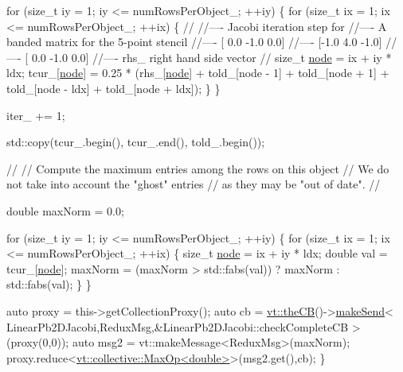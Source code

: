 \begin{DoxyCodeInclude}
    \textcolor{keywordflow}{for} (\textcolor{keywordtype}{size\_t} iy = 1; iy <= numRowsPerObject\_; ++iy) \{
      \textcolor{keywordflow}{for} (\textcolor{keywordtype}{size\_t} ix = 1; ix <= numRowsPerObject\_; ++ix) \{
        \textcolor{comment}{//}
        \textcolor{comment}{//---- Jacobi iteration step for}
        \textcolor{comment}{//---- A banded matrix for the 5-point stencil}
        \textcolor{comment}{//---- [ 0.0  -1.0   0.0]}
        \textcolor{comment}{//---- [-1.0   4.0  -1.0]}
        \textcolor{comment}{//---- [ 0.0  -1.0   0.0]}
        \textcolor{comment}{//---- rhs\_ right hand side vector}
        \textcolor{comment}{//}
        \textcolor{keywordtype}{size\_t} \hyperlink{namespacevt_1_1config_a46e57c33bee1b9f1fa95455af86d80e0a576033c81e2ddd03d721ecef3b1b3f81}{node} = ix + iy * ldx;
        tcur\_[\hyperlink{namespacevt_1_1config_a46e57c33bee1b9f1fa95455af86d80e0a576033c81e2ddd03d721ecef3b1b3f81}{node}] = 0.25 * (rhs\_[\hyperlink{namespacevt_1_1config_a46e57c33bee1b9f1fa95455af86d80e0a576033c81e2ddd03d721ecef3b1b3f81}{node}]
                              + told\_[node - 1] + told\_[node + 1]
                              + told\_[node - ldx] + told\_[node + ldx]);
      \}
    \}

    iter\_ += 1;

    std::copy(tcur\_.begin(), tcur\_.end(), told\_.begin());

    \textcolor{comment}{//}
    \textcolor{comment}{// Compute the maximum entries among the rows on this object}
    \textcolor{comment}{// We do not take into account the "ghost" entries}
    \textcolor{comment}{// as they may be "out of date".}
    \textcolor{comment}{//}

    \textcolor{keywordtype}{double} maxNorm = 0.0;

    \textcolor{keywordflow}{for} (\textcolor{keywordtype}{size\_t} iy = 1; iy <= numRowsPerObject\_; ++iy) \{
      \textcolor{keywordflow}{for} (\textcolor{keywordtype}{size\_t} ix = 1; ix <= numRowsPerObject\_; ++ix) \{
        \textcolor{keywordtype}{size\_t} \hyperlink{namespacevt_1_1config_a46e57c33bee1b9f1fa95455af86d80e0a576033c81e2ddd03d721ecef3b1b3f81}{node} = ix + iy * ldx;
        \textcolor{keywordtype}{double} val = tcur\_[\hyperlink{namespacevt_1_1config_a46e57c33bee1b9f1fa95455af86d80e0a576033c81e2ddd03d721ecef3b1b3f81}{node}];
        maxNorm = (maxNorm > std::fabs(val)) ? maxNorm : std::fabs(val);
      \}
    \}

    \textcolor{keyword}{auto} proxy = this->getCollectionProxy();
    \textcolor{keyword}{auto} cb = \hyperlink{namespacevt_a673b109e94c7bca58313504c83e1da94}{vt::theCB}()->\hyperlink{structvt_1_1pipe_1_1_pipe_manager_a73583be6260418b13ee66e56cdade2da}{makeSend}<
      LinearPb2DJacobi,ReduxMsg,&LinearPb2DJacobi::checkCompleteCB
    >(proxy(0,0));
    \textcolor{keyword}{auto} msg2 = vt::makeMessage<ReduxMsg>(maxNorm);
    proxy.reduce<\hyperlink{structvt_1_1collective_1_1reduce_1_1operators_1_1_max_op}{vt::collective::MaxOp<double>}>(msg2.get(),cb);
  \}


\end{DoxyCodeInclude}
